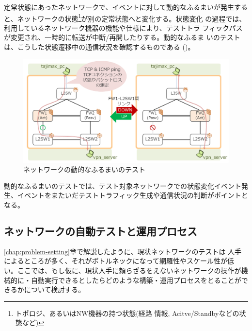 定常状態にあったネットワークで、イベントに対して動的なふるまいが発生する
と、ネットワークの状態\footnote{トポロジ、あるいはNW機器の持つ状態(経路
情報, Acitve/Standbyなどの状態など)}が別の定常状態へと変化する。状態変化
の過程では、利用しているネットワーク機器の機能や仕様により、テストトラ
フィックパスが変更され、一時的に転送が中断/再開したりする。動的なふるま
いのテストは、こうした状態遷移中の通信状況を確認するものである
()。
\begin{figure}[h]
 \centering
 \includegraphics[scale=0.5]{img/test-dynamic.png}
 \caption{ネットワークの動的なふるまいのテスト}
 \label{fig:test-dynamic}
\end{figure}

動的なふるまいのテストでは、テスト対象ネットワークでの状態変化イベント発
生、イベントをまたいだテストトラフィック生成や通信状況の判断がポイントと
なる。

  \subsection{ネットワークの自動テストと運用プロセス}
  \label{sec:network-test-and-process}


\ref{chap:problem-setting}章で解説したように、現状ネットワークのテストは
人手によるところが多く、それがボトルネックになって網羅性やスケール性が低
い。ここでは、もし仮に、現状人手に頼らざるをえないネットワークの操作が機
械的に・自動実行できるとしたらどのような構築・運用プロセスをとることがで
きるかについて検討する。

